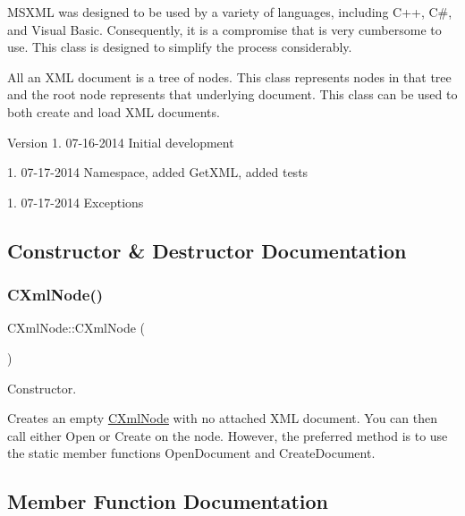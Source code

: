 M\+S\+X\+ML was designed to be used by a variety of languages, including C++, C\#, and Visual Basic. Consequently, it is a compromise that is very cumbersome to use. This class is designed to simplify the process considerably.

All an X\+ML document is a tree of nodes. This class represents nodes in that tree and the root node represents that underlying document. This class can be used to both create and load X\+ML documents.

\begin{DoxyVersion}{Version}
1. 07-\/16-\/2014 Initial development 

1. 07-\/17-\/2014 Namespace, added Get\+X\+ML, added tests 

1. 07-\/17-\/2014 Exceptions 
\end{DoxyVersion}


\subsection{Constructor \& Destructor Documentation}
\mbox{\label{classxmlnode_1_1_c_xml_node_a0f05b63e034bb5620609a2020c591d55}} 
\subsubsection{\texorpdfstring{CXmlNode()}{CXmlNode()}}
{\footnotesize\ttfamily C\+Xml\+Node\+::\+C\+Xml\+Node (\begin{DoxyParamCaption}{ }\end{DoxyParamCaption})}



Constructor. 

Creates an empty \mbox{\hyperlink{classxmlnode_1_1_c_xml_node}{C\+Xml\+Node}} with no attached X\+ML document. You can then call either Open or Create on the node. However, the preferred method is to use the static member functions Open\+Document and Create\+Document. 

\subsection{Member Function Documentation}
\mbox{\label{classxmlnode_1_1_c_xml_node_a7227a654358ffb87a2a57c165dee509c}} 
